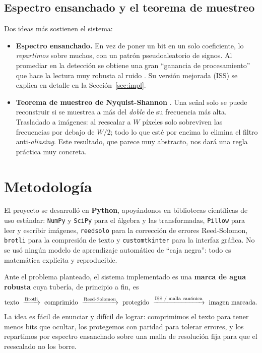 \documentclass[12pt,a4paper]{article}
\renewcommand{\nobreakdash}{}
\begin{document}
\subsection{Espectro ensanchado y el teorema de muestreo}

Dos ideas más sostienen el sistema:
\begin{itemize}[leftmargin=1.6em]
\item \textbf{Espectro ensanchado.} En vez de poner un bit en un solo coeficiente, lo
\emph{repartimos} sobre muchos, con un patrón pseudoaleatorio de signos. Al promediar en la
detección se obtiene una gran ``ganancia de procesamiento'' que hace la lectura muy robusta
al ruido \cite{cox1997}. Su versión mejorada (ISS) \cite{malvar2003} se explica en detalle
en la Sección~\ref{sec:impl}.
\item \textbf{Teorema de muestreo de Nyquist\nobreakdash-Shannon}
\cite{nyquist1928,shannon1949}. Una señal solo se puede reconstruir si se muestrea a más
del \emph{doble} de su frecuencia más alta. Trasladado a imágenes: al reescalar a $W$
píxeles solo sobreviven las frecuencias por debajo de $W/2$; todo lo que esté por encima lo
elimina el filtro anti\emph{-aliasing}. Este resultado, que parece muy abstracto, nos dará
una regla práctica muy concreta.
\end{itemize}

\section{Metodología}

El proyecto se desarrolló en \textbf{Python}, apoyándonos en bibliotecas científicas de
uso estándar: \texttt{NumPy} y \texttt{SciPy} para el álgebra y las transformadas,
\texttt{Pillow} para leer y escribir imágenes, \texttt{reedsolo} para la corrección de
errores Reed\nobreakdash-Solomon, \texttt{brotli} para la compresión de texto y
\texttt{customtkinter} para la interfaz gráfica. No se usó ningún modelo de aprendizaje
automático de ``caja negra'': todo es matemática explícita y reproducible.

Ante el problema planteado, el sistema implementado es una \textbf{marca de agua robusta}
cuya tubería, de principio a fin, es
\[
\text{texto}\ \xrightarrow{\text{Brotli}}\ \text{comprimido}\
\xrightarrow{\text{Reed\text{-}Solomon}}\ \text{protegido}\
\xrightarrow{\text{ISS / malla canónica}}\ \text{imagen marcada}.
\]
La idea es fácil de enunciar y difícil de lograr: comprimimos el texto para tener menos bits
que ocultar, los protegemos con paridad para tolerar errores, y los repartimos por espectro
ensanchado sobre una malla de resolución fija para que el reescalado no los borre.
\end{document}
